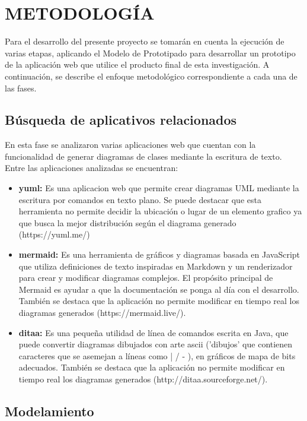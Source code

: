 \documentclass[12pt,a4paper,final]{article}
\begin{document}
	\section{METODOLOGÍA}
	
	Para el desarrollo del presente proyecto se tomarán en cuenta la ejecución de varias etapas, aplicando el Modelo de Prototipado para desarrollar un prototipo de la aplicación web que utilice el producto final de esta investigación. A continuación, se describe el enfoque metodológico correspondiente a cada una de las fases. 
	
	\subsection{Búsqueda de aplicativos relacionados}
	
	En esta fase se analizaron varias aplicaciones web que cuentan con la funcionalidad de generar diagramas de clases mediante la escritura de texto. Entre las aplicaciones analizadas se encuentran:
	
	\begin{itemize}
		\item \textbf{yuml: }Es una aplicacion web que permite crear diagramas UML mediante la escritura por comandos en texto plano. Se puede destacar que esta herramienta no permite decidir la ubicación o lugar de un elemento grafico ya que busca la mejor distribución según el diagrama generado (https://yuml.me/)
		
		\item \textbf{mermaid: }Es una herramienta de gráficos y diagramas basada en JavaScript que utiliza definiciones de texto inspiradas en Markdown y un renderizador para crear y modificar diagramas complejos. El propósito principal de Mermaid es ayudar a que la documentación se ponga al día con el desarrollo. También se destaca que la aplicación no permite modificar en tiempo real los diagramas generados (https://mermaid.live/).
		
		\item \textbf{ditaa: }Es una pequeña utilidad de línea de comandos escrita en Java, que puede convertir diagramas dibujados con arte ascii ('dibujos' que contienen caracteres que se asemejan a líneas como | / - ), en gráficos de mapa de bits adecuados. También se destaca que la aplicación no permite modificar en tiempo real los diagramas generados (http://ditaa.sourceforge.net/). 
	\end{itemize}
	
	\subsection{Modelamiento}
	
\end{document}
